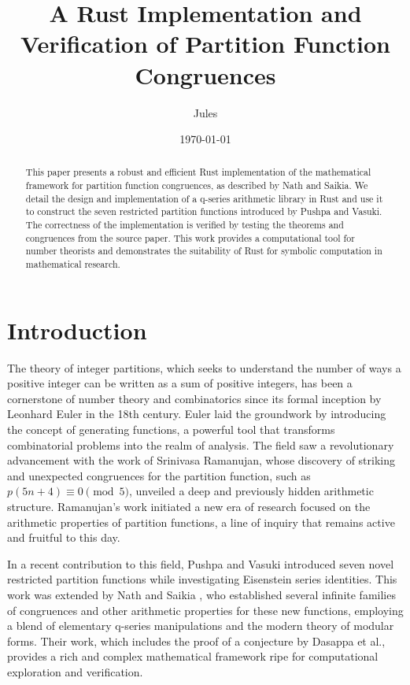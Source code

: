 \documentclass{article}
\title{A Rust Implementation and Verification of Partition Function Congruences}
\author{Jules}
\date{\today}
\begin{document}
\maketitle

\begin{abstract}
This paper presents a robust and efficient Rust implementation of the mathematical framework for partition function congruences, as described by Nath and Saikia. We detail the design and implementation of a q-series arithmetic library in Rust and use it to construct the seven restricted partition functions introduced by Pushpa and Vasuki. The correctness of the implementation is verified by testing the theorems and congruences from the source paper. This work provides a computational tool for number theorists and demonstrates the suitability of Rust for symbolic computation in mathematical research.
\end{abstract}

\section{Introduction}

The theory of integer partitions, which seeks to understand the number of ways a positive integer can be written as a sum of positive integers, has been a cornerstone of number theory and combinatorics since its formal inception by Leonhard Euler in the 18th century. Euler laid the groundwork by introducing the concept of generating functions, a powerful tool that transforms combinatorial problems into the realm of analysis. The field saw a revolutionary advancement with the work of Srinivasa Ramanujan, whose discovery of striking and unexpected congruences for the partition function, such as $p(5n+4) \equiv 0 \pmod{5}$, unveiled a deep and previously hidden arithmetic structure. Ramanujan's work initiated a new era of research focused on the arithmetic properties of partition functions, a line of inquiry that remains active and fruitful to this day.

In a recent contribution to this field, Pushpa and Vasuki \cite{pushpa2022eisenstein} introduced seven novel restricted partition functions while investigating Eisenstein series identities. This work was extended by Nath and Saikia \cite{nath2025arithmetic}, who established several infinite families of congruences and other arithmetic properties for these new functions, employing a blend of elementary q-series manipulations and the modern theory of modular forms. Their work, which includes the proof of a conjecture by Dasappa et al., provides a rich and complex mathematical framework ripe for computational exploration and verification.
\end{document}
